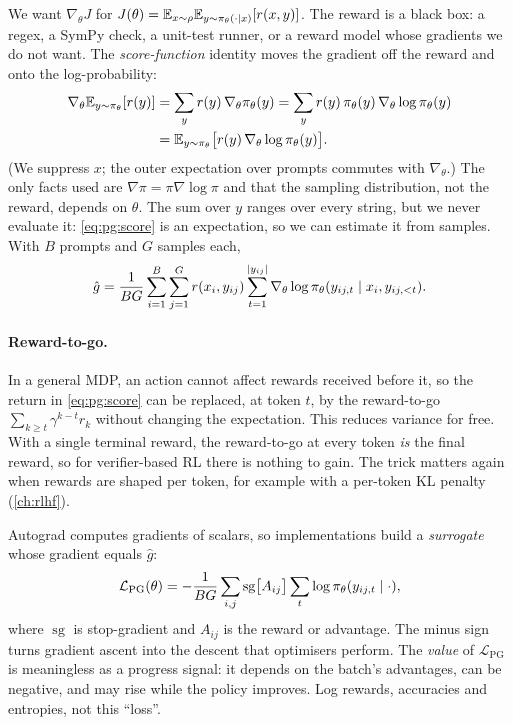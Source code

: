 We want $\nabla_\theta J$ for $J(\theta)=\mathbb{E}_{x\sim\rho}\mathbb{E}_{y\sim\pi_\theta(\cdot\mid x)}[r(x,y)]$.
The reward is a black box: a regex, a SymPy check, a unit-test runner, or a reward model whose
gradients we do not want. The \emph{score-function} identity moves the gradient off the
reward and onto the log-probability:
\begin{align}
\nabla_\theta \mathbb{E}_{y\sim\pi_\theta}[r(y)]
 &=\sum_y r(y)\,\nabla_\theta\pi_\theta(y)
  =\sum_y r(y)\,\pi_\theta(y)\,\nabla_\theta\log\pi_\theta(y)\nonumber\\
 &=\mathbb{E}_{y\sim\pi_\theta}\big[r(y)\,\nabla_\theta\log\pi_\theta(y)\big].
\label{eq:pg:score}
\end{align}
(We suppress $x$; the outer expectation over prompts commutes with $\nabla_\theta$.) The
only facts used are $\nabla\pi=\pi\nabla\log\pi$ and that the sampling distribution, not
the reward, depends on $\theta$. The sum over $y$ ranges over every string, but we never
evaluate it: \cref{eq:pg:score} is an expectation, so we can estimate it from samples. With
$B$ prompts and $G$ samples each,
\begin{equation}
\hat g=\frac{1}{BG}\sum_{i=1}^{B}\sum_{j=1}^{G} r(x_i,y_{ij})\sum_{t=1}^{|y_{ij}|}
\nabla_\theta\log\pi_\theta(y_{ij,t}\mid x_i,y_{ij,<t}).
\label{eq:pg:reinforce}
\end{equation}

\paragraph{Reward-to-go.} In a general MDP, an action cannot affect rewards received before
it, so the return in \cref{eq:pg:score} can be replaced, at token $t$, by the reward-to-go
$\sum_{k\ge t}\gamma^{k-t}r_k$ without changing the expectation. This reduces variance for
free. With a single terminal reward, the reward-to-go at every token \emph{is} the final
reward, so for verifier-based RL there is nothing to gain. The trick matters again when
rewards are shaped per token, for example with a per-token KL penalty (\cref{ch:rlhf}).

\begin{keyidea}
Autograd computes gradients of scalars, so implementations build a \emph{surrogate} whose
gradient equals $\hat g$:
\[
\mathcal{L}_{\text{PG}}(\theta)=-\frac{1}{BG}\sum_{i,j}\operatorname{sg}\!\big[A_{ij}\big]
\sum_t\log\pi_\theta(y_{ij,t}\mid\cdot),
\]
where $\operatorname{sg}$ is stop-gradient and $A_{ij}$ is the reward or advantage. The
minus sign turns gradient ascent into the descent that optimisers perform. The
\emph{value} of $\mathcal{L}_{\text{PG}}$ is meaningless as a progress signal: it depends on
the batch's advantages, can be negative, and may rise while the policy improves. Log rewards,
accuracies and entropies, not this ``loss''.
\end{keyidea}

